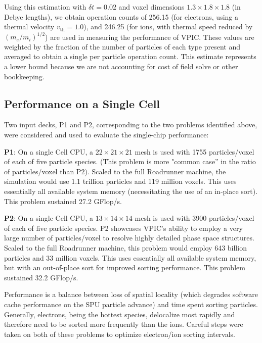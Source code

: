 \documentclass[10pt]{article}
\begin{document}
Using this estimation with $\delta t = 0.02$ and voxel dimensions $1.3
\times 1.8 \times 1.8$ (in Debye lengths), we obtain operation counts
of 256.15 (for electrons, using a thermal velocity $v_{\mathrm{th}} =
1.0$), and 246.25 (for ions, with thermal speed reduced by
$(m_e/m_i)^{1/2}$) are used in measuring the performance of VPIC.
These values are weighted by the fraction of the number of particles
of each type present and averaged to obtain a single per particle
operation count.  This estimate represents a lower bound because we
are not accounting for cost of field solve or other bookkeeping.

\subsection{Performance on a Single Cell}

Two input decks, P1 and P2, corresponding to the two problems
identified above, were considered and used to evaluate the
single-chip performance:

\textbf{P1}:  On a single Cell CPU, a $22 \times 21 \times 21$ mesh 
is used with 1755 particles/voxel of each of five particle species.
(This problem is more "common case'' in the ratio of particles/voxel
than P2).  Scaled to the full Roadrunner machine, the simulation would
use 1.1 trillion particles and 119 million voxels.  This uses
essentially all available system memory (necessitating the use of an
in-place sort).  This problem sustained 27.2 GFlop/s.

\textbf{P2}:  On a single Cell CPU, a $13 \times 14 \times 14$ mesh 
is used with 3900 particles/voxel of each of five particle species.
P2 showcases VPIC's ability to employ a very large number of
particles/voxel to resolve highly detailed phase space structures.
Scaled to the full Roadrunner machine, this problem would employ 643
billion particles and 33 million voxels. This uses essentially all
available system memory, but with an out-of-place sort for improved
sorting performance.  This problem sustained 32.2 GFlop/s.

Performance is a balance between loss of spatial locality (which
degrades software cache performance on the SPU particle advance) and
time spent sorting particles.  Generally, electrons, being the hottest
species, delocalize most rapidly and therefore need to be sorted more
frequently than the ions.  Careful steps were taken on both of these
problems to optimize electron/ion sorting intervals.
\end{document}
